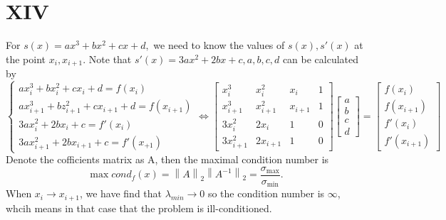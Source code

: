 \documentclass[a4paper]{article}
\begin{document}
\section*{XIV}
For $s(x) = ax^3+bx^2+cx+d,$ we need to know the values of $s(x),s'(x)$ at the point $x_i,x_{i+1}$. 
Note that $s'(x) = 3ax^2 + 2bx + c,a,b,c,d$ can be calculated by 
\begin{equation*}
    \begin{cases}
        ax_{i}^3+bx_{i}^2+cx_{i}+d = f(x_{i}) \\
        ax_{i+1}^3 + bz_{i+1}^2+cx_{i+1}+d = f(x_{i+1}) \\
        3ax_{i}^2 + 2bx_{i} + c = f'(x_i) \\
        3ax_{i+1}^2 + 2bx_{i+1} + c = f'(x_{+1})
    \end{cases}
    \Leftrightarrow
    \left[
    \begin{matrix}
        x_{i}^3 & x_{i}^2 & x_{i} & 1 \\
        x_{i+1}^3 & x_{i+1}^2 & x_{i+1} & 1 \\
        3x_{i}^2 & 2x_i & 1 & 0 \\
        3x_{i+1}^2 & 2x_{i+1} & 1 & 0
    \end{matrix}
    \right] \left[
    \begin{matrix}
        a \\ b \\ c \\ d
    \end{matrix}
    \right]
    =
    \left[
    \begin{matrix}
        f(x_i) \\ f(x_{i+1}) \\ f'(x_i) \\ f'(x_{i+1})
    \end{matrix}
    \right]
\end{equation*}
Denote the cofficients matrix as A, then the maximal condition number is 
$$
\max cond_f(x) = \left\lVert A\right\rVert _2 \left\lVert A^{-1}\right\rVert _2
= \frac{\sigma_{\max}}{\sigma_{\min}}.
$$
When $x_i \to x_{i+1} $, we have find that $\lambda_{min} \to 0$ so the condition number is $\infty$, whcih means in that case that the problem is ill-conditioned.

\section*{  }
\printbibliography
\end{document}
